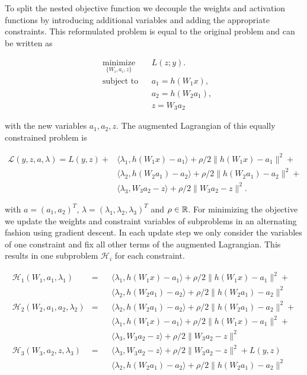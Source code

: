 \documentclass[english,11pt,a4paper]{article}
\newcommand\inner[2]{\langle #1, #2 \rangle}
\begin{document}
To split the nested objective function we decouple the weights and activation functions
by introducing additional variables and adding the appropriate constraints. This reformulated problem is equal to the original problem and can be written as

\begin{equation}
	\begin{aligned}
		& \underset{\{W_i,a_i,z\}}{\text{minimize}}
		&& L(z;y). \\
		& \text{subject to}
		&&  a_1 = h(W_1x), \\
		&&& a_2 = h(W_2a_1), \\
		&&& z = W_3a_2
	\end{aligned}
\end{equation}

with the new variables $a_1, a_2, z$. The augmented Lagrangian of this equally constrained problem is

\begin{equation}
	\begin{aligned}
		\mathcal{L}(y,z,a,\lambda) = L(y,z) + 
		& \inner{\lambda_1}{h(W_1x)-a_1} + \rho/2 \| h(W_1x)-a_1 \|^2 + \\
		& \inner{\lambda_2}{h(W_2a_1)-a_2} + \rho/2 \| h(W_2a_1)-a_2 \|^2 + \\
		& \inner{\lambda_3}{W_3a_2-z} + \rho/2 \| W_3a_2-z \|^2.
	\end{aligned}
\end{equation}

with $a = (a_1,a_2)^T$, $\lambda = (\lambda_1, \lambda_2, \lambda_3)^T$ and $\rho \in \mathbb{R}$. For minimizing the objective we update the weights and constraint variables of subproblems in an alternating fashion using gradient descent. In each update step we only consider the variables of one constraint and fix all other terms of the augmented Lagrangian. This results in one subproblem $\mathcal{H}_i$ for each constraint.

\begin{equation}
	\begin{aligned}
		\mathcal{H}_1(W_1,a_1,\lambda_1) &= && \inner{\lambda_1}{h(W_1x)-a_1} + \rho/2 \| h(W_1x)-a_1 \|^2 + \\
			& && \inner{\lambda_2}{h(W_2a_1)-a_2} + \rho/2 \| h(W_2a_1)-a_2 \|^2 \\
		\mathcal{H}_2(W_2,a_1,a_2,\lambda_2) &= && \inner{\lambda_2}{h(W_2a_1)-a_2} + \rho/2 \| h(W_2a_1)-a_2 \|^2 + \\
			& && \inner{\lambda_1}{h(W_1x)-a_1} + \rho/2 \| h(W_1x)-a_1 \|^2 + \\
			& && \inner{\lambda_3}{W_3a_2-z} + \rho/2 \| W_3a_2-z \|^2 \\
		\mathcal{H}_3(W_3,a_2,z,\lambda_3) &= && \inner{\lambda_3}{W_3a_2-z} + \rho/2 \| W_3a_2-z \|^2 + L(y,z) \\
			& && \inner{\lambda_2}{h(W_2a_1)-a_2} + \rho/2 \| h(W_2a_1)-a_2 \|^2 
	\end{aligned}
\end{equation}
\end{document}
